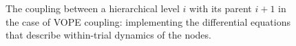 \begin{figure}
  \centering

  \small

  \newcommand{\w}[1]{\textcolor{white}{#1}}
  \def\svgwidth{0.9\textwidth}


  \caption{The coupling between a hierarchical level $i$ with its parent $i+1$ in the case of \textsf{VOPE} coupling: implementing the differential equations that describe within-trial dynamics of the nodes.}
  \label{\figlabel}
\end{figure}
